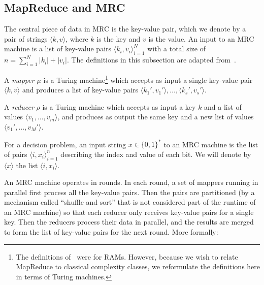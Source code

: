 \subsection{MapReduce and MRC}

The central piece of data in MRC is the key-value pair, which we denote by a
pair of strings $\langle k, v \rangle$, where $k$ is the key and $v$ is the
value. An input to an MRC machine is a list of key-value pairs $\langle k_i,
v_i \rangle_{i=1}^N$ with a total size of $n = \sum_{i=1}^N |k_i| + |v_i|$.
The definitions in this subsection are adapted from~\cite{Karloff10}.

\begin{definition}
A \emph{mapper} $\mu$ is a Turing machine\footnote{The definitions
of~\cite{Karloff10} were for RAMs. However, because we wish to relate MapReduce
to classical complexity classes, we reformulate the definitions here in terms
of Turing machines.} which accepts as input a single key-value pair $\langle k,
v \rangle$ and produces a list of key-value pairs $\langle k_1', v_1' \rangle,
\dots, \langle k_s', v_s' \rangle$. \end{definition}

\begin{definition}
A \emph{reducer} $\rho$ is a Turing machine which accepts as input a key $k$
and a list of values $\langle v_1 , \dots, v_m \rangle$, and produces as output
the same key and a new list of values $\langle v_1', \dots, v_M' \rangle$.
\end{definition}

\begin{definition}
For a decision problem, an input string $x \in \{ 0,1 \}^*$ to an MRC machine
is the list of pairs $\langle i, x_i \rangle_{i=1}^n$ describing the index
and value of each bit. We will denote by $\langle x \rangle$ the list $\langle
i, x_i \rangle$.
\end{definition}

An MRC machine operates in rounds. In each round, a set of mappers running in
parallel first process all the key-value pairs. Then the pairs are partitioned
(by a mechanism called ``shuffle and sort'' that is not considered part of the
runtime of an MRC machine) so that each reducer only receives key-value pairs
for a single key. Then the reducers process their data in parallel, and the
results are merged to form the list of key-value pairs for the next round. More
formally:


